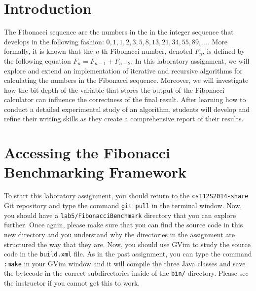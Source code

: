 


\usepackage[compact]{titlesec}


\section*{Introduction}

The Fibonacci sequence are the numbers in the in the integer sequence that develops in the following fashion: $0, 1, 1,
2, 3, 5, 8, 13, 21, 34, 55, 89, \ldots$. More formally, it is known that the {\em n}-th Fibonacci number, denoted $F_n$,
is defined by the following equation $F_n = F_{n-1} + F_{n-2}$. In this laboratory assignment, we will explore and
extend an implementation of iterative and recursive algorithms for calculating the numbers in the Fibonacci sequence.
Moreover, we will investigate how the bit-depth of the variable that stores the output of the Fibonacci calculator can
influence the correctness of the final result. After learning how to conduct a detailed experimental study of an
algorithm, students will develop and refine their writing skills as they create a comprehensive report of their results.

\section*{Accessing the Fibonacci Benchmarking Framework}

\begin{sloppypar} To start this laboratory assignment, you should return to the {\tt cs112S2014-share} Git repository
  and type the command {\tt git pull} in the terminal window.  Now, you should have a {\tt lab5/FibonacciBenchmark}
  directory that you can explore further.  Once again, please make sure that you can find the source code in this new
  directory and you understand why the directories in the assignment are structured the way that they are. Now, you
  should use GVim to study the source code in the {\tt build.xml} file.  As in the past assignment, you can type the
  command {\tt :make} in your GVim window and it will compile the three Java classes and save the bytecode in the
  correct subdirectories inside of the {\tt bin/} directory.  Please see the instructor if you cannot get this to work.
\end{sloppypar}
 
